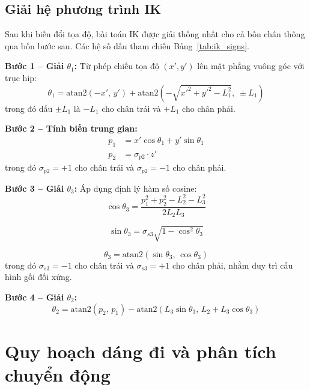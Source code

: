 \subsection{Giải hệ phương trình IK}

Sau khi biến đổi tọa độ, bài toán IK được giải thống nhất cho cả bốn chân thông qua bốn bước sau. Các hệ số dấu tham chiếu Bảng~\ref{tab:ik_signs}.

\textbf{Bước 1 -- Giải $\theta_1$:} Từ phép chiếu tọa độ $(x', y')$ lên mặt phẳng vuông góc với trục hip:
\begin{equation}
\theta_1 =
\mathrm{atan2}(-x',\, y')
+
\mathrm{atan2}
\left(
-\sqrt{x'^2 + y'^2 - L_1^2},\; \pm L_1
\right)
\label{eq:ik_theta1}
\end{equation}
trong đó dấu $\pm L_1$ là $-L_1$ cho chân trái và $+L_1$ cho chân phải.

\textbf{Bước 2 -- Tính biến trung gian:}
\begin{equation}
\begin{aligned}
p_1 &= x' \cos\theta_1 + y' \sin\theta_1 \\
p_2 &= \sigma_{p2} \cdot z'
\end{aligned}
\label{eq:ik_p1p2}
\end{equation}
trong đó $\sigma_{p2} = +1$ cho chân trái và $\sigma_{p2} = -1$ cho chân phải.

\textbf{Bước 3 -- Giải $\theta_3$:} Áp dụng định lý hàm số cosine:
\begin{equation}
\cos\theta_3 =
\frac{p_1^2 + p_2^2 - L_2^2 - L_3^2}{2 L_2 L_3}
\end{equation}

\begin{equation}
\sin\theta_3 =
\sigma_{s3} \sqrt{1 - \cos^2\theta_3}
\end{equation}

\begin{equation}
\theta_3 = \mathrm{atan2}(\sin\theta_3,\, \cos\theta_3)
\end{equation}
trong đó $\sigma_{s3} = -1$ cho chân trái và $\sigma_{s3} = +1$ cho chân phải, nhằm duy trì cấu hình gối đối xứng.

\textbf{Bước 4 -- Giải $\theta_2$:}
\begin{equation}
\theta_2 =
\mathrm{atan2}(p_2,\, p_1)
-
\mathrm{atan2}(L_3 \sin\theta_3,\, L_2 + L_3 \cos\theta_3)
\label{eq:ik_theta2}
\end{equation}

\section{Quy hoạch dáng đi và phân tích chuyển động }

